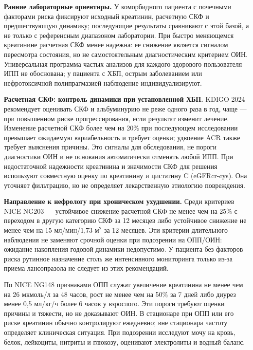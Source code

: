 \documentclass[11pt,a4paper,notitlepage]{report}
\newcommand{\src}[1]{\unskip\space\cite{#1}}
\begin{document}
\textbf{Ранние лабораторные ориентиры.} У коморбидного пациента с почечными факторами риска фиксируют исходный креатинин, расчетную СКФ и предшествующую динамику; последующие результаты сравнивают с этой базой, а не только с референсным диапазоном лаборатории. При быстро меняющемся креатинине расчетная СКФ менее надежна: ее снижение является сигналом пересмотра состояния, но не самостоятельным диагностическим критерием ОИН. Универсальная программа частых анализов для каждого здорового пользователя ИПП не обоснована; у пациента с ХБП, острым заболеванием или нефротоксичной полипрагмазией наблюдение индивидуализируют.\src{renalniceckd,acggerd}

\textbf{Расчетная СКФ: контроль динамики при установленной ХБП.} KDIGO 2024 рекомендует оценивать СКФ и альбуминурию не реже одного раза в год, чаще --- при повышенном риске прогрессирования, если результат изменит лечение. Изменение расчетной СКФ более чем на 20\% при последующем исследовании превышает ожидаемую вариабельность и требует оценки; удвоение ACR также требует выяснения причины. Это сигналы для обследования, не пороги диагностики ОИН и не основания автоматически отменять любой ИПП. При недостаточной надежности креатинина и значимости СКФ для решения используют совместную оценку по креатинину и цистатину C (eGFRcr-cys). Она уточняет фильтрацию, но не определяет лекарственную этиологию повреждения.\src{renalkdigo2024}

\textbf{Направление к нефрологу при хроническом ухудшении.} Среди критериев NICE NG203 --- устойчивое снижение расчетной СКФ не менее чем на 25\% с переходом в другую категорию СКФ за 12 месяцев либо устойчивое снижение не менее чем на 15 мл/мин/1,73 м$^2$ за 12 месяцев. Эти критерии длительного наблюдения не заменяют срочной оценки при подозрении на ОПП/ОИН: ожидание накопления годовой динамики недопустимо. У пациента без факторов риска рутинное назначение столь же интенсивного мониторинга только из-за приема лансопразола не следует из этих рекомендаций.\src{renalniceckd,renalniceaki,acggerd}

По NICE NG148 признаками ОПП служат увеличение креатинина не менее чем на 26 мкмоль/л за 48 часов, рост не менее чем на 50\% за 7 дней либо диурез менее 0,5 мл/кг/ч более 6 часов у взрослого. Эти пороги требуют оценки причины и тяжести, но не доказывают ОИН. В стационаре при ОПП или его риске креатинин обычно контролируют ежедневно; вне стационара частоту определяет клиническая ситуация. При подозрении исследуют мочу на кровь, белок, лейкоциты, нитриты и глюкозу, оценивают электролиты и водный баланс.\src{renalniceaki}
\end{document}
